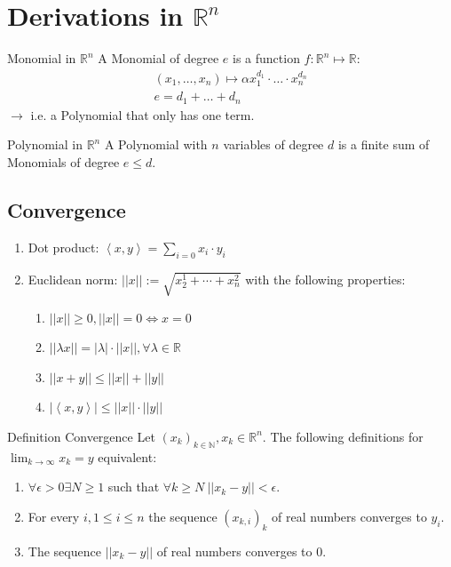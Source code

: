 \documentclass[a4paper,fontsize = 10pt]{article}
\def\R{\mathbb{R}}
\begin{document}
\section{Derivations in \texorpdfstring{\(\R^n\)}{Rⁿ}}
\begin{subbox}{Monomial in $\R^n$}
  A Monomial of degree \(e\) is a function $f: \R^n \mapsto \R:$
  \begin{align*}
    (x_1, \ldots, x_n) \mapsto \alpha x_1^{d_1}\cdot \ldots \cdot x_n^{d_n} \\
    e = d_1 + \ldots + d_n 
  \end{align*}
  \(\to\) i.e. a Polynomial that only has one term.
\end{subbox}
\begin{mainbox}{Polynomial in $\R^n$}
  A Polynomial with \(n\) variables of degree \(d\) is a finite sum of Monomials of degree \(e \le d\).
\end{mainbox}

\subsection{Convergence}
\begin{enumerate}
  \item Dot product: \(\left< x,y\right> = \sum_{i=0} x_i \cdot y_i\)
  \item Euclidean norm: \(||x|| := \sqrt{x_2^1 + \cdots + x_n^2}\) with the following properties:
  \begin{enumerate}
    \item \(||x|| \ge 0, ||x|| = 0 \iff x = 0\)
    \item \(||\lambda x|| = |\lambda| \cdot ||x||, \forall \lambda \in \R\)
    \item \(||x+y|| \le ||x|| + ||y||\)
    \item \(|\left<x,y\right>| \le ||x|| \cdot ||y||\)
  \end{enumerate}
\end{enumerate}

\begin{mainbox}{Definition Convergence}
  Let \((x_k)_{k \in \mathbb{N}}, x_k \in \R^n\). The following definitions for \(\lim_{k\to\infty}x_k = y\) equivalent:
  \begin{enumerate}
    \item \(\forall \epsilon > 0 \exists N \ge 1\) such that \(\forall k \ge N \ ||x_k - y|| < \epsilon\).
    \item For every \(i, 1 \le i \le n\) the sequence \((x_{k,i})_k\) of real numbers converges to \(y_i\).
    \item The sequence \(||x_k - y||\) of real numbers converges to \(0\).
  \end{enumerate}
\end{mainbox}
\end{document}
